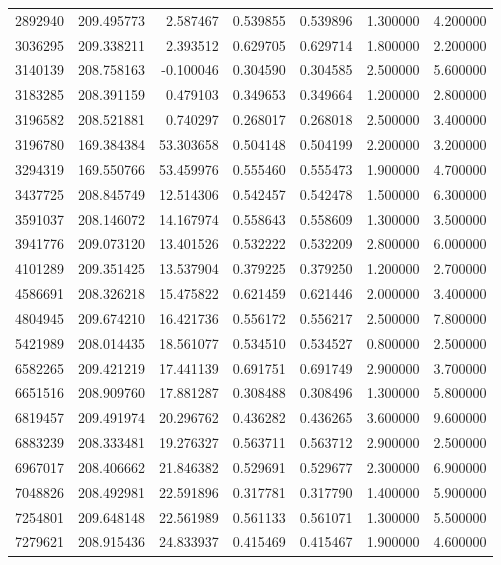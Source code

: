 \begin{tabular}{lrrrrrr}
2892940 & 209.495773 & 2.587467 & 0.539855 & 0.539896 & 1.300000 & 4.200000 \\
3036295 & 209.338211 & 2.393512 & 0.629705 & 0.629714 & 1.800000 & 2.200000 \\
3140139 & 208.758163 & -0.100046 & 0.304590 & 0.304585 & 2.500000 & 5.600000 \\
3183285 & 208.391159 & 0.479103 & 0.349653 & 0.349664 & 1.200000 & 2.800000 \\
3196582 & 208.521881 & 0.740297 & 0.268017 & 0.268018 & 2.500000 & 3.400000 \\
3196780 & 169.384384 & 53.303658 & 0.504148 & 0.504199 & 2.200000 & 3.200000 \\
3294319 & 169.550766 & 53.459976 & 0.555460 & 0.555473 & 1.900000 & 4.700000 \\
3437725 & 208.845749 & 12.514306 & 0.542457 & 0.542478 & 1.500000 & 6.300000 \\
3591037 & 208.146072 & 14.167974 & 0.558643 & 0.558609 & 1.300000 & 3.500000 \\
3941776 & 209.073120 & 13.401526 & 0.532222 & 0.532209 & 2.800000 & 6.000000 \\
4101289 & 209.351425 & 13.537904 & 0.379225 & 0.379250 & 1.200000 & 2.700000 \\
4586691 & 208.326218 & 15.475822 & 0.621459 & 0.621446 & 2.000000 & 3.400000 \\
4804945 & 209.674210 & 16.421736 & 0.556172 & 0.556217 & 2.500000 & 7.800000 \\
5421989 & 208.014435 & 18.561077 & 0.534510 & 0.534527 & 0.800000 & 2.500000 \\
6582265 & 209.421219 & 17.441139 & 0.691751 & 0.691749 & 2.900000 & 3.700000 \\
6651516 & 208.909760 & 17.881287 & 0.308488 & 0.308496 & 1.300000 & 5.800000 \\
6819457 & 209.491974 & 20.296762 & 0.436282 & 0.436265 & 3.600000 & 9.600000 \\
6883239 & 208.333481 & 19.276327 & 0.563711 & 0.563712 & 2.900000 & 2.500000 \\
6967017 & 208.406662 & 21.846382 & 0.529691 & 0.529677 & 2.300000 & 6.900000 \\
7048826 & 208.492981 & 22.591896 & 0.317781 & 0.317790 & 1.400000 & 5.900000 \\
7254801 & 209.648148 & 22.561989 & 0.561133 & 0.561071 & 1.300000 & 5.500000 \\
7279621 & 208.915436 & 24.833937 & 0.415469 & 0.415467 & 1.900000 & 4.600000 \\

\end{tabular}

